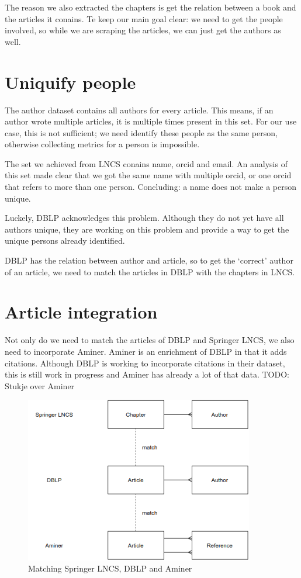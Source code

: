 \documentclass{ou-report}
\newcommand{\todo}[1]{{\color{red} TODO: #1}}
\begin{document}
The reason we also extracted the chapters is get the relation between a book and
the articles it conains. Te keep our main goal clear: we need to get the people
involved, so while we are scraping the articles, we can just get the authors as 
well.

\section{Uniquify people}
The author dataset contains all authors for every article. This means, if an 
author wrote multiple articles, it is multiple times present in this set. For
our use case, this is not sufficient; we need identify these people as the same 
person, otherwise collecting metrics for a person is impossible.

The set we achieved from LNCS conains name, orcid and email. An analysis of this
set made clear that we got the same name with multiple orcid, or one orcid that 
refers to more than one person. Concluding: a name does not make a person 
unique.

Luckely, DBLP acknowledges this problem. Although they do not yet have all 
authors unique, they are working on this problem and provide a way to get the 
unique persons already identified.

DBLP has the relation between author and article, so to get the `correct' author
of an article, we need to match the articles in DBLP with the chapters in LNCS.


\section{Article integration}
Not only do we need to match the articles of DBLP and Springer LNCS, we also 
need to incorporate Aminer. Aminer is an enrichment of DBLP in that it adds
citations. Although DBLP is working to incorporate citations in their dataset,
this is still work in progress and Aminer has already a lot of that data.
\todo{Stukje over Aminer}

\begin{figure}[H]
    \centering
    \includegraphics[width=10cm]{images/linking_article_dblp_lncs_aminer.drawio.png}
    \caption{Matching Springer LNCS, DBLP and Aminer}
    \label{fig:linking_article_dblp_lncs_aminer}
\end{figure}
\end{document}
